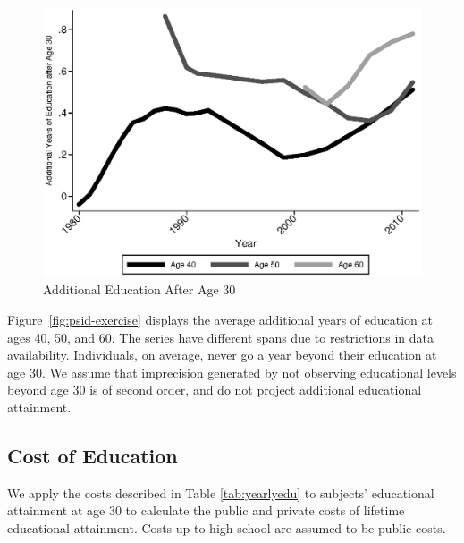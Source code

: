\begin{center}
\begin{figure}[H] 
\caption{Additional Education After Age 30} \label{fig:psid-exercise}
\label{figure:youlabel}
\centering
\includegraphics[width=.9\columnwidth]{AppOutput/Education/addeducfrom30.eps}
\end{figure}
\end{center}

\noindent Figure~\ref{fig:psid-exercise} displays the average additional years of education at ages 40, 50, and 60. The series have different spans due to restrictions in data availability. Individuals, on average, never go a year beyond their education at age 30. We assume that imprecision generated by not observing educational levels beyond age 30 is of second order, and do not project additional educational attainment.

\subsection{Cost of Education}
\noindent We apply the costs described in Table \ref{tab:yearlyedu} to subjects' educational attainment at age 30 to calculate the public and private costs of lifetime educational attainment. Costs up to high school are assumed to be public costs. \\

